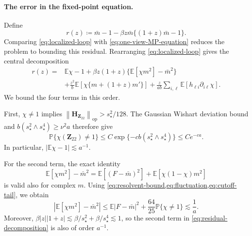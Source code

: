 \documentclass[11pt]{article}
\newcommand{\opn}[1]{\left\lVert #1\right\rVert_{\mathrm{op}}}
\begin{document}
\paragraph{The error in the fixed-point equation.}
Define
\[
  r(z)
  \coloneqq
  \bar m
  -
  1
  -
  \beta z\bar m
  \bigl\{
    (1+z)\bar m-1
  \bigr\}.
\]
Comparing \cref{eq:localized-loop} with
\cref{eq:one-view-MP-equation} reduces the problem to bounding this
residual. Rearranging \cref{eq:localized-loop} gives the central
decomposition
\begin{equation}
\label{eq:residual-decomposition}
\begin{aligned}
  r(z)
  ={}&
  \mathbb E\chi-1
  +
  \beta z(1+z)
  \bigl\{
    \mathbb E[\chi m^2]-\bar m^2
  \bigr\} \\
  &+
  \frac{z^2}{b}
  \mathbb E\left[
    \chi\{m+(1+z)m'\}
  \right]
  +
  \frac{z}{ab}
  \sum_{i,\ell}
  \mathbb E\left[
    h_{\ell i}\partial_{i\ell}\chi
  \right].
\end{aligned}
\end{equation}
We bound the four terms in this order.

First, $\chi\ne1$ implies
$\opn{\bm H_{\bm Z_{22}}}>s_\star^2/128$. The Gaussian Wishart deviation
bound and $b(s_\star^2\wedge s_\star^4)\ge\nu^2a$ therefore give
\begin{equation}
\label{eq:cutoff-tail}
  \mathbb P\{\chi(\bm Z_{22})\ne1\}
  \le
  C\exp\{-cb(s_\star^2\wedge s_\star^4)\}
  \le
  Ce^{-ca}.
\end{equation}
In particular, $|\mathbb E\chi-1|\lesssim a^{-1}$.

For the second term, the exact identity
\[
  \mathbb E[\chi m^2]-\bar m^2
  =
  \mathbb E[(F-\bar m)^2]
  +
  \mathbb E[\chi(1-\chi)m^2]
\]
is valid also for complex $m$. Using
\cref{eq:resolvent-bound,eq:fluctuation,eq:cutoff-tail}, we obtain
\begin{equation}
\label{eq:quadratic-bias}
  \left|
    \mathbb E[\chi m^2]-\bar m^2
  \right|
  \le
  \mathbb E|F-\bar m|^2
  +
  \frac{64}{25}\mathbb P\{\chi\ne1\}
  \lesssim
  \frac1a.
\end{equation}
Moreover,
$\beta|z||1+z|
\lesssim\beta/s_\star^2+\beta/s_\star^4\lesssim1$, so the second term in
\cref{eq:residual-decomposition} is also of order $a^{-1}$.
\end{document}
